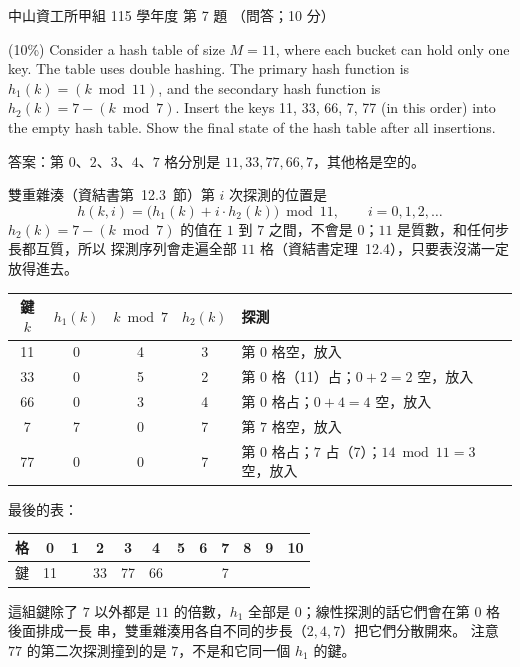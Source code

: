 \begin{pastexam}[label={px:nsysu-115-osds-03}]{中山資工所甲組 115 學年度 第 7 題}
（問答；10 分）

(10\%) Consider a hash table of size $M=11$, where each bucket can hold only one key. The table
uses double hashing. The primary hash function is $h_1(k)=(k \bmod 11)$, and the secondary hash
function is $h_2(k)=7-(k \bmod 7)$. Insert the keys 11, 33, 66, 7, 77 (in this order) into the
empty hash table. Show the final state of the hash table after all insertions.
\end{pastexam}

\begin{pastsoln}
答案：第 $0$、$2$、$3$、$4$、$7$ 格分別是 $11, 33, 77, 66, 7$，其他格是空的。

雙重雜湊（資結書第~12.3~節）第 $i$ 次探測的位置是
\[
h(k, i) = \bigl(h_1(k) + i \cdot h_2(k)\bigr) \bmod 11, \qquad i = 0, 1, 2, \ldots
\]
$h_2(k) = 7 - (k \bmod 7)$ 的值在 $1$ 到 $7$ 之間，不會是 $0$；$11$ 是質數，和任何步長都互質，所以
探測序列會走遍全部 $11$ 格（資結書定理~12.4），只要表沒滿一定放得進去。
\begin{center}
\small
\begin{tabular}{ccccl}
\toprule
鍵 $k$ & $h_1(k)$ & $k \bmod 7$ & $h_2(k)$ & 探測 \\
\midrule
11 & 0 & 4 & 3 & 第 $0$ 格空，放入 \\
33 & 0 & 5 & 2 & 第 $0$ 格（11）占；$0 + 2 = 2$ 空，放入 \\
66 & 0 & 3 & 4 & 第 $0$ 格占；$0 + 4 = 4$ 空，放入 \\
7 & 7 & 0 & 7 & 第 $7$ 格空，放入 \\
77 & 0 & 0 & 7 & 第 $0$ 格占；$7$ 占（7）；$14 \bmod 11 = 3$ 空，放入 \\
\bottomrule
\end{tabular}
\end{center}
最後的表：
\begin{center}
\small
\begin{tabular}{|c|c|c|c|c|c|c|c|c|c|c|c|}
\hline
格 & 0 & 1 & 2 & 3 & 4 & 5 & 6 & 7 & 8 & 9 & 10 \\ \hline
鍵 & 11 & & 33 & 77 & 66 & & & 7 & & & \\ \hline
\end{tabular}
\end{center}
這組鍵除了 $7$ 以外都是 $11$ 的倍數，$h_1$ 全部是 $0$；線性探測的話它們會在第 $0$ 格後面排成一長
串，雙重雜湊用各自不同的步長（$2, 4, 7$）把它們分散開來。 注意 $77$ 的第二次探測撞到的是
$7$，不是和它同一個 $h_1$ 的鍵。
\end{pastsoln}
